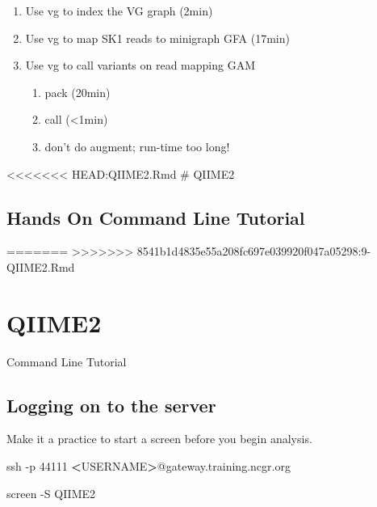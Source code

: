 \documentclass[
]{book}
\newenvironment{Shaded}{\begin{snugshade}}{\end{snugshade}}
\newcommand{\AttributeTok}[1]{\textcolor[rgb]{0.77,0.63,0.00}{#1}}
\newcommand{\ExtensionTok}[1]{#1}
\newcommand{\FunctionTok}[1]{\textcolor[rgb]{0.00,0.00,0.00}{#1}}
\newcommand{\NormalTok}[1]{#1}
\newcommand{\OperatorTok}[1]{\textcolor[rgb]{0.81,0.36,0.00}{\textbf{#1}}}
\providecommand{\tightlist}{%
  \setlength{\itemsep}{0pt}\setlength{\parskip}{0pt}}
\begin{document}
\begin{enumerate}
\def\labelenumi{\arabic{enumi}.}
\tightlist
\item
  Use vg to index the VG graph (2min)
\item
  Use vg to map SK1 reads to minigraph GFA (17min)
\item
  Use vg to call variants on read mapping GAM

  \begin{enumerate}
  \def\labelenumii{\alph{enumii}.}
  \tightlist
  \item
    pack (20min)
  \item
    call (\textless1min)
  \item
    don't do augment; run-time too long!
  \end{enumerate}
\end{enumerate}

\textless\textless\textless\textless\textless\textless\textless{} HEAD:QIIME2.Rmd
\# QIIME2

\hypertarget{hands-on-command-line-tutorial}{%
\section{Hands On Command Line Tutorial}\label{hands-on-command-line-tutorial}}

=======
\textgreater\textgreater\textgreater\textgreater\textgreater\textgreater\textgreater{} 8541b1d4835e55a208fc697e039920f047a05298:9-QIIME2.Rmd

\hypertarget{qiime2}{%
\chapter{QIIME2}\label{qiime2}}

Command Line Tutorial

\hypertarget{logging-on-to-the-server}{%
\section{Logging on to the server}\label{logging-on-to-the-server}}

Make it a practice to start a screen before you begin analysis.

\begin{Shaded}
\begin{Highlighting}[]
\FunctionTok{ssh} \AttributeTok{{-}p}\NormalTok{ 44111 }\OperatorTok{\textless{}}\NormalTok{USERNAME}\OperatorTok{\textgreater{}}\NormalTok{@gateway.training.ncgr.org}

\ExtensionTok{screen} \AttributeTok{{-}S}\NormalTok{ QIIME2}
\end{Highlighting}
\end{Shaded}
\end{document}
